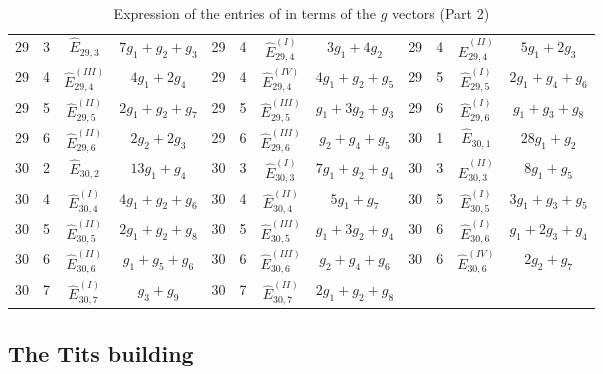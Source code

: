 \documentclass[a4paper,11pt]{article}
\begin{document}
\begin{table}
\begin{center}
{\begin{tabular}{|cccc|cccc|cccc|}
29  &  3  &  $\widehat{E}_{29,3}$  &  $7g_{1}+g_{2}+g_{3}$    &    29  &  4  &  $\widehat{E}_{29,4}^{(I)}$  &  $3g_{1}+4g_{2}$    &    29  &  4  &  $\widehat{E}_{29,4}^{(II)}$  &  $5g_{1}+2g_{3}$\\
29  &  4  &  $\widehat{E}_{29,4}^{(III)}$  &  $4g_{1}+2g_{4}$    &    29  &  4  &  $\widehat{E}_{29,4}^{(IV)}$  &  $4g_{1}+g_{2}+g_{5}$    &    29  &  5  &  $\widehat{E}_{29,5}^{(I)}$  &  $2g_{1}+g_{4}+g_{6}$\\
29  &  5  &  $\widehat{E}_{29,5}^{(II)}$  &  $2g_{1}+g_{2}+g_{7}$    &    29  &  5  &  $\widehat{E}_{29,5}^{(III)}$  &  $g_{1}+3g_{2}+g_{3}$    &    29  &  6  &  $\widehat{E}_{29,6}^{(I)}$  &  $g_{1}+g_{3}+g_{8}$\\
29  &  6  &  $\widehat{E}_{29,6}^{(II)}$  &  $2g_{2}+2g_{3}$    &    29  &  6  &  $\widehat{E}_{29,6}^{(III)}$  &  $g_{2}+g_{4}+g_{5}$    &    30  &  1  &  $\widehat{E}_{30,1}$  &  $28g_{1}+g_{2}$\\
30  &  2  &  $\widehat{E}_{30,2}$  &  $13g_{1}+g_{4}$    &    30  &  3  &  $\widehat{E}_{30,3}^{(I)}$  &  $7g_{1}+g_{2}+g_{4}$    &    30  &  3  &  $\widehat{E}_{30,3}^{(II)}$  &  $8g_{1}+g_{5}$\\
30  &  4  &  $\widehat{E}_{30,4}^{(I)}$  &  $4g_{1}+g_{2}+g_{6}$    &    30  &  4  &  $\widehat{E}_{30,4}^{(II)}$  &  $5g_{1}+g_{7}$    &    30  &  5  &  $\widehat{E}_{30,5}^{(I)}$  &  $3g_{1}+g_{3}+g_{5}$\\
30  &  5  &  $\widehat{E}_{30,5}^{(II)}$  &  $2g_{1}+g_{2}+g_{8}$    &    30  &  5  &  $\widehat{E}_{30,5}^{(III)}$  &  $g_{1}+3g_{2}+g_{4}$    &    30  &  6  &  $\widehat{E}_{30,6}^{(I)}$  &  $g_{1}+2g_{3}+g_{4}$\\
30  &  6  &  $\widehat{E}_{30,6}^{(II)}$  &  $g_{1}+g_{5}+g_{6}$    &    30  &  6  &  $\widehat{E}_{30,6}^{(III)}$  &  $g_{2}+g_{4}+g_{6}$    &    30  &  6  &  $\widehat{E}_{30,6}^{(IV)}$  &  $2g_{2}+g_{7}$\\
30  &  7  &  $\widehat{E}_{30,7}^{(I)}$  &  $g_{3}+g_{9}$    &    30  &  7  &  $\widehat{E}_{30,7}^{(II)}$  &  $2g_{1}+g_{2}+g_{8}$    &      &&&             \\
\hline
\end{tabular}
}
\caption{Expression of the entries of \cite[Appendix]{CDGK} in terms of the $g$ vectors (Part 2)}
\label{Expression_Isotropic_Vectors_Part2}
\end{center}
\end{table}

\newpage
\subsection{The Tits building}\label{subsec:isotropic}
\end{document}
